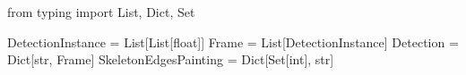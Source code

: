 \startPY
from typing import List, Dict, Set

DetectionInstance = List[List[float]]
Frame = List[DetectionInstance]
Detection = Dict[str, Frame]
SkeletonEdgesPainting = Dict[Set[int], str]

\stopPY
\stopbuffer
